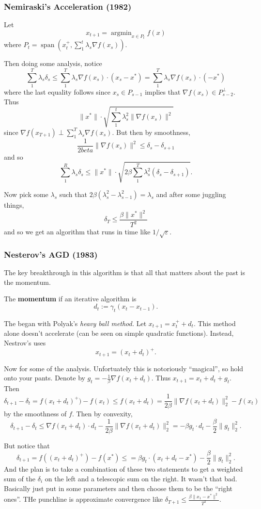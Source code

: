 \documentclass[12pt]{article}
\DeclareMathOperator*{\argmin}{argmin}
\newcommand{\grad}{\nabla}
\begin{document}
\subsubsection{Nemiraski's Acceleration (1982)}
Let 
\[x_{t+1}=\argmin_{x\in P_t} f(x)\]
where $P_t=\operatorname{span}(x_t^+,\sum_1^t \lambda_s\nabla f(x_s))$.

Then doing some analysis, notice
\[\sum_1^T\lambda_s\delta_s\le\sum_1^T\lambda_s\grad f(x_s)\cdot(x_s-x^\ast)=\sum_1^T\lambda_s\grad f(x_s)\cdot(-x^\ast)\]
where the last equality follows since $x_s\in P_{s-1}$ implies that $\grad f(x_s)\in P_{s-2}^\perp$. Thus 
\[\|x^\ast\|\cdot\sqrt{\sum_1^t\lambda_s^2\|\grad f(x_s)\|^2}\]
since $\grad f(x_{T+1})\perp \sum_1^T\lambda_s\grad f(x_s)$. But then by smoothness, 
\[\frac{1}{2beta}\|\grad f(x_s)\|^2\le \delta_s-\delta_{s+1}\]
and so 
\[\sum_1^R\lambda_s\delta_s\le\|x^\ast\|\cdot\sqrt{2\beta\sum_1^T\lambda_s^2(\delta_s-\delta_{s+1})}.\]

Now pick some $\lambda_s$ such that $2\beta(\lambda_s^2-\lambda_{s-1}^2)=\lambda_s$ and after some juggling things, 
\[\delta_T\le\frac{\beta\|x^\ast\|^2}{T^2}\]
and so we get an algorithm that runs in time like $1/\sqrt{\varepsilon}$.

\subsubsection{Nesterov's AGD (1983)}
The key breakthrough in this algorithm is that all that matters about the past is the momentum.
\begin{defn}
	The \textbf{momentum} if an iterative algorithm is 
	\[d_t:=\gamma_t(x_t-x_{t-1}).\]
\end{defn}

The began with Polyak's \textit{heavy ball method.} Let $x_{t+1}=x_t^++d_t$. This method alone doesn't accelerate (can be seen on simple quadratic functions).
Instead, Nestrov's uses
\[x_{t+1}=(x_t+d_t)^+.\]

Now for some of the analysis. Unfortuately this is notoriously ``magical'', so hold onto your pants. Denote by $g_t=-\frac{1}{\beta}\grad f(x_t+d_t)$. Thus $x_{t+1}=x_t+d_t+g_t.$
Then 
\[\delta_{t+1}-\delta_t=f(x_t+d_t)^+)-f(x_t)\le f(x_t+d_t)=\frac{1}{2\beta}\|\grad f(x_t+d_t)\|_2^2-f(x_t)\]
by the smoothness of $f$. Then by convexity,
\[\delta_{t+1}-\delta_t\le \grad f(x_t+d_t)\cdot d_t-\frac{1}{2\beta}\|\grad f(x_t+d_t)\|_2^2=-\beta g_t\cdot d_t-\frac{\beta}{2}\|g_t\|_2^2.\]

But notice that 
\[\delta_{t+1}=f((x_t+d_t)^+)-f(x^\ast)\le=\beta g_t\cdot(x_t+d_t-x^\ast)-\frac{\beta}{2}\|g_t\|_2^2.\]
And the plan is to take a combination of these two statements to get a weighted sum of the $\delta_i$ on the left and a telescopic sum on the right. It wasn't that bad. Basically just put in some parameters and then choose them to be the ``right ones''.
THe punchline is approximate convergence like $\delta_{T+1}\le\frac{\beta\|x_1-x^\ast\|^2}{T^2}.$
\end{document}
